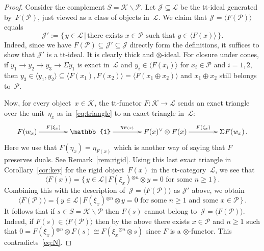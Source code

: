 \documentclass{amsart}
\numberwithin{equation}{section}
\theoremstyle{remark}
\begin{document}
\begin{proof}
Consider the complement $S={\mathscr{{K}}}{\!\smallsetminus\!} {{\mathscr{{P}}}}$. Let ${\mathscr{{J}}}\subseteq{\mathscr{{L}}}$ be the tt-ideal generated by~$F({{\mathscr{{P}}}})$, just viewed as a class of objects in~${\mathscr{{L}}}$. We claim that ${\mathscr{{J}}}={\langle {F({{\mathscr{{P}}}})}\rangle}$ equals
\[
{\mathscr{{J}}}':={\big\{\,{y\in{\mathscr{{L}}}}\,\big|\,{\textrm{there exists }x\in{{\mathscr{{P}}}}\textrm{ such that }y\in{\langle {F(x)}\rangle}}\,\big\}}.
\]
Indeed, since we have $F({{\mathscr{{P}}}})\subseteq{\mathscr{{J}}}'\subseteq{\mathscr{{J}}}$ directly form the definitions, it suffices to show that ${\mathscr{{J}}}'$ is a tt-ideal. It is clearly thick and $\otimes$-ideal. For closure under cones, if $y_1\to y_2\to y_3\to \Sigma y_1$ is exact in~${\mathscr{{L}}}$ and $y_i\in{\langle {F(x_i)}\rangle}$ for $x_i\in{{\mathscr{{P}}}}$ and $i=1,2$, then $y_3\in{\langle {y_1,y_2}\rangle}\subseteq{\langle {F(x_1),F(x_2)}\rangle}={\langle {F(x_1\oplus x_2)}\rangle}$ and $x_1\oplus x_2$ still belongs to~${{\mathscr{{P}}}}$.

Now, for every object~$x\in{\mathscr{{K}}}$, the tt-functor $F\colon{\mathscr{{K}}}\to {\mathscr{{L}}}$ sends an exact triangle over the unit~$\eta_x$ as in~\eqref{eq:triangle} to an exact triangle in~${\mathscr{{L}}}$:
\[
\xymatrix@C=4em{
F(w_x) \ar[r]^-{F(\xi_x)}
& {\mathbb{1}} \ar[r]^-{\eta_{F(x)}}
& F(x)^\vee\otimes F(x) \ar[r]^-{F(\zeta_x)}
& \Sigma F(w_x)\,.
}
\]
Here we use that $F(\eta_x)=\eta_{F(x)}$ which is another way of saying that $F$ preserves duals. See Remark~\ref{rem:rigid}. Using this last exact triangle in Corollary~\ref{cor:key} for the rigid object~$F(x)$ in the tt-category~${\mathscr{{L}}}$, we see that
\[
{\langle {F(x)}\rangle}={\big\{\,{y\in{\mathscr{{L}}}}\,\big|\,{F(\xi_x){^{\otimes {n}}}\otimes y=0\textrm{ for some }n\ge 1}\,\big\}}\,.
\]
Combining this with the description of~${\mathscr{{J}}}={\langle {F({{\mathscr{{P}}}})}\rangle}$ as ${\mathscr{{J}}}'$ above, we obtain
\[
{\langle {F({{\mathscr{{P}}}})}\rangle}={\big\{\,{y\in{\mathscr{{L}}}}\,\big|\,{F(\xi_x){^{\otimes {n}}}\otimes y=0\textrm{ for some }n\ge 1\textrm{ and some }x\in{{\mathscr{{P}}}}}\,\big\}}\,.
\]
It follows that if $s\in S={\mathscr{{K}}}{\!\smallsetminus\!}{{\mathscr{{P}}}}$ then $F(s)$ cannot belong to~${\mathscr{{J}}}={\langle {F({{\mathscr{{P}}}})}\rangle}$. Indeed, if $F(s)\in{\langle {F({{\mathscr{{P}}}})}\rangle}$ then by the above there exists $x\in{{\mathscr{{P}}}}$ and $n\ge1$ such that $0=F(\xi_x){^{\otimes {n}}}\otimes F(s)\cong F(\xi_x{^{\otimes {n}}}\otimes s)$ since $F$ is a $\otimes$-functor. This contradicts~\eqref{eq:N}.


\end{proof}
\end{document}
